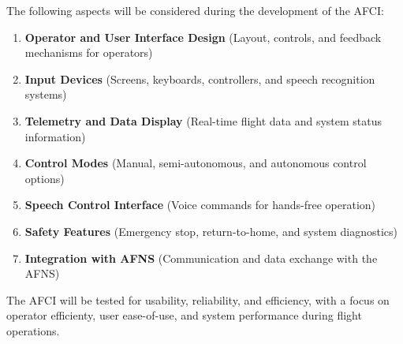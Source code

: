 \documentclass[12pt]{article}
\begin{document}
The following aspects will be considered during the development of the AFCI:
\begin{enumerate}
    \item \textbf{Operator and User Interface Design} (Layout, controls, and feedback mechanisms for operators)
    \item \textbf{Input Devices} (Screens, keyboards, controllers, and speech recognition systems)
    \item \textbf{Telemetry and Data Display} (Real-time flight data and system status information)
    \item \textbf{Control Modes} (Manual, semi-autonomous, and autonomous control options)
    \item \textbf{Speech Control Interface} (Voice commands for hands-free operation)
    \item \textbf{Safety Features} (Emergency stop, return-to-home, and system diagnostics)
    \item \textbf{Integration with AFNS} (Communication and data exchange with the AFNS)
\end{enumerate}

The AFCI will be tested for usability, reliability, and efficiency, with a focus on operator efficienty, user ease-of-use, and system performance during flight operations.
\end{document}

